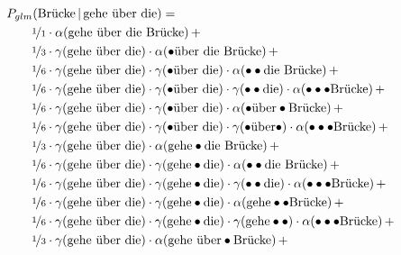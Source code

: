 \documentclass[11pt,a4paper]{article}
\newcommand\givenbase[1][]{\,#1\lvert\,}
\let\given\givenbase
\newcommand{\probSymbol}[1][]{P_{#1}}
\newcommand{\prob}[2][]{\probSymbol[#1](#2)}
\newcommand{\probCond}[3][]{\prob[#1]{#2 \given #3}}
\begin{document}
\begin{equation}
  \begin{split}
    &\hspace{-2em}\probCond[glm]{\text{Br\"ucke}}{\text{gehe \"uber die}} = \\
    &\nicefrac{1}{1} \cdot \alpha(\text{gehe \"uber die Br\"ucke}) \, + \\
    &\nicefrac{1}{3} \cdot \gamma(\text{gehe \"uber die}) \cdot \alpha(\bullet\text{\"uber die Br\"ucke}) \, + \\
    &\nicefrac{1}{6} \cdot \gamma(\text{gehe \"uber die}) \cdot \gamma(\bullet\text{\"uber die}) \cdot \alpha(\bullet\bullet\text{die Br\"ucke}) \, + \\
    &\nicefrac{1}{6} \cdot \gamma(\text{gehe \"uber die}) \cdot \gamma(\bullet\text{\"uber die}) \cdot \gamma(\bullet\bullet\text{die}) \cdot \alpha(\bullet\bullet\bullet\text{Br\"ucke}) \, + \\
    &\nicefrac{1}{6} \cdot \gamma(\text{gehe \"uber die}) \cdot \gamma(\bullet\text{\"uber die}) \cdot \alpha(\bullet\text{\"uber}\bullet\text{Br\"ucke}) \, + \\
    &\nicefrac{1}{6} \cdot \gamma(\text{gehe \"uber die}) \cdot \gamma(\bullet\text{\"uber die}) \cdot \gamma(\bullet\text{\"uber}\bullet) \cdot \alpha(\bullet\bullet\bullet\text{Br\"ucke}) \, + \\
    &\nicefrac{1}{3} \cdot \gamma(\text{gehe \"uber die}) \cdot \alpha(\text{gehe}\bullet\text{die Br\"ucke}) \, + \\
    &\nicefrac{1}{6} \cdot \gamma(\text{gehe \"uber die}) \cdot \gamma(\text{gehe}\bullet\text{die}) \cdot \alpha(\bullet\bullet\text{die Br\"ucke}) \, + \\
    &\nicefrac{1}{6} \cdot \gamma(\text{gehe \"uber die}) \cdot \gamma(\text{gehe}\bullet\text{die}) \cdot \gamma(\bullet\bullet\text{die}) \cdot \alpha(\bullet\bullet\bullet\text{Br\"ucke}) \, + \\
    &\nicefrac{1}{6} \cdot \gamma(\text{gehe \"uber die}) \cdot \gamma(\text{gehe}\bullet\text{die}) \cdot \alpha(\text{gehe}\bullet\bullet\text{Br\"ucke}) \, + \\
    &\nicefrac{1}{6} \cdot \gamma(\text{gehe \"uber die}) \cdot \gamma(\text{gehe}\bullet\text{die}) \cdot \gamma(\text{gehe}\bullet\bullet) \cdot \alpha(\bullet\bullet\bullet\text{Br\"ucke}) \, + \\
    &\nicefrac{1}{3} \cdot \gamma(\text{gehe \"uber die}) \cdot \alpha(\text{gehe \"uber}\bullet\text{Br\"ucke}) \, + \\

\end{split}
\end{equation}
\end{document}
